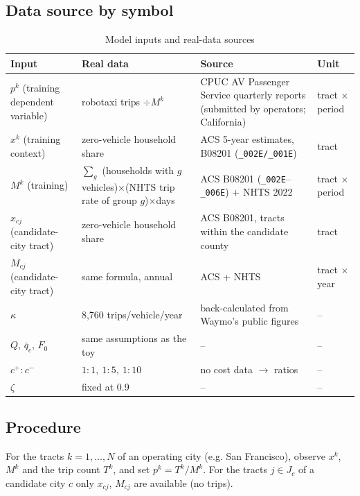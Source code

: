 \documentclass[10pt,a4paper]{article}
\begin{document}
\subsection{Data source by symbol}

\begin{table}[H]\centering\small
\caption{Model inputs and real-data sources}\label{tab:realdata}
\begin{tabular}{@{}L{0.17\textwidth}L{0.30\textwidth}L{0.33\textwidth}L{0.12\textwidth}@{}}
\toprule
Input & Real data & Source & Unit \\ \midrule
$p^k$ (training dependent variable) & robotaxi trips $\div M^k$ & CPUC AV Passenger Service quarterly reports (submitted by operators; California) & tract $\times$ period \\
$x^k$ (training context) & zero-vehicle household share & ACS 5-year estimates, B08201 (\texttt{\_002E/\_001E}) & tract \\
$M^k$ (training) & $\sum_g$ (households with $g$ vehicles)$\times$(NHTS trip rate of group $g$)$\times$days & ACS B08201 (\texttt{\_002E}--\texttt{\_006E}) + NHTS 2022 & tract $\times$ period \\
$x_{cj}$ (candidate-city tract) & zero-vehicle household share & ACS B08201, tracts within the candidate county & tract \\
$M_{cj}$ (candidate-city tract) & same formula, annual & ACS + NHTS & tract $\times$ year \\
$\kappa$ & 8{,}760 trips/vehicle/year & back-calculated from Waymo's public figures & -- \\
$Q$, $\bar q_c$, $F_0$ & same assumptions as the toy & -- & -- \\
$c^+:c^-$ & $1{:}1,\ 1{:}5,\ 1{:}10$ & no cost data $\to$ ratios & -- \\
$\zeta$ & fixed at 0.9 & -- & -- \\
\bottomrule
\end{tabular}
\end{table}

\subsection{Procedure}

For the tracts $k=1,\dots,N$ of an operating city (e.g. San Francisco), observe $x^k$, $M^k$ and the trip count $T^k$, and set $p^k=T^k/M^k$. For the tracts $j\in J_c$ of a candidate city $c$ only $x_{cj}$, $M_{cj}$ are available (no trips).
\end{document}
